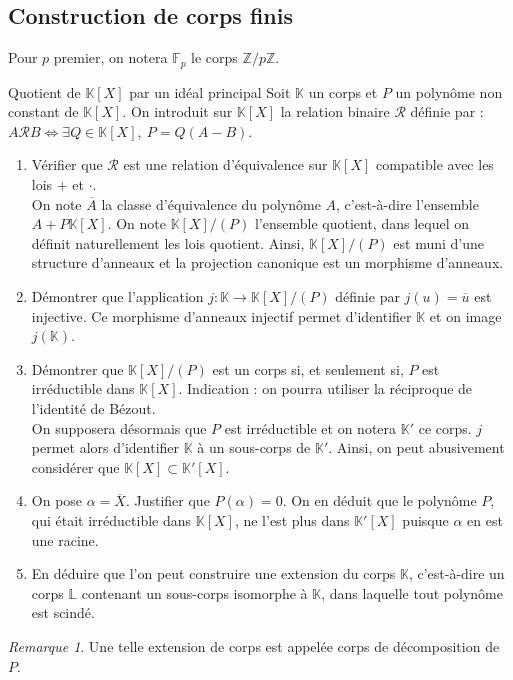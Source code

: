 \documentclass[french,a4paper]{article}
\newcommand{\Z}{\mathbb{Z}}
\newcommand{\K}{\mathbb{K}}
\renewcommand{\L}{\mathbb{L}}
\newcommand{\F}{\mathbb{F}}
\theoremstyle{plain}
\theoremstyle{definition}
\theoremstyle{remark}
\newtheorem*{rmq}{Remarque}
\begin{document}
\subsection{Construction de corps finis}
Pour $p$ premier, on notera $\F_p$ le corps $\Z/p\Z$.
\begin{ex}{Quotient de $\K[X]$ par un idéal principal}
	Soit $\K$ un corps et $P$ un polynôme non constant de $\K[X]$. On introduit sur $\K[X]$ la relation binaire $\mathcal{R}$ définie par : $A\mathcal{R}B\iff \exists Q\in\K[X],\ P=Q(A-B)$.
	\begin{enumerate}
		\item Vérifier que $\mathcal{R}$ est une relation d'équivalence sur $\K[X]$ compatible avec les lois $+$ et $\cdot$. \\
		On note $\overline{A}$ la classe d'équivalence du polynôme $A$, c'est-à-dire l'ensemble $A+P\K[X]$. On note $\K[X]/(P)$ l'ensemble quotient, dans lequel on définit naturellement les lois quotient. Ainsi, $\K[X]/(P)$ est muni d'une structure d'anneaux et la projection canonique est un morphisme d'anneaux.
		\item Démontrer que l'application $j:\K\to\K[X]/(P)$ définie par $j(u)=\overline{u}$ est injective. Ce morphisme d'anneaux injectif permet d'identifier $\K$ et on image $j(\K)$.
		\item Démontrer que $\K[X]/(P)$ est un corps si, et seulement si, $P$ est irréductible dans $\K[X]$. Indication : on pourra utiliser la réciproque de l'identité de Bézout. \\
		On supposera désormais que $P$ est irréductible et on notera $\K'$ ce corps. $j$ permet alors d'identifier $\K$ à un sous-corps de $\K'$. Ainsi, on peut abusivement considérer que $\K[X]\subset\K'[X]$.
		\item On pose $\alpha=\overline{X}$. Justifier que $P(\alpha)=0$. On en déduit que le polynôme $P$, qui était irréductible dans $\K[X]$, ne l'est plus dans $\K'[X]$ puisque $\alpha$ en est une racine.
		\item En déduire que l'on peut construire une extension du corps $\K$, c'est-à-dire un corps $\L$ contenant un sous-corps isomorphe à $\K$, dans laquelle tout polynôme est scindé.
	\end{enumerate}
\end{ex}
\begin{rmq}
	Une telle extension de corps est appelée corps de décomposition de $P$.
\end{rmq}
\end{document}
